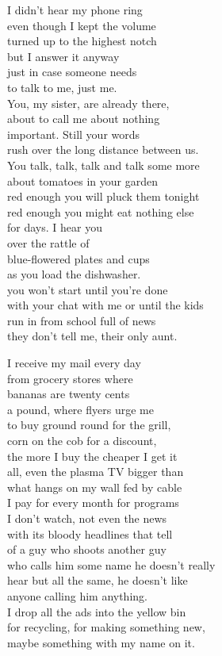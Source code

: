 \documentclass[twoside,10pt]{book}
\begin{document}
I didn't hear my phone ring\\
even though I kept the volume\\
turned up to the highest notch\\
but I answer it anyway\\
just in case someone needs\\
to talk to me, just me.\\
You, my sister, are already there,\\
about to call me about nothing\\
important. Still your words\\
rush over the long distance between us.\\
You talk, talk, talk and talk some more\\
about tomatoes in your garden\\
red enough you will pluck them tonight\\
red enough you might eat nothing else\\
for days. I hear you\\
over the rattle of\\
blue-flowered plates and cups\\
as you load the dishwasher.\\
you won't start until you're done\\
with your chat with me or until the kids\\
run in from school full of news\\
they don't tell me, their only aunt.

I receive my mail every day\\
from grocery stores where\\
bananas are twenty cents\\
a pound, where flyers urge me\\
to buy ground round for the grill,\\
corn on the cob for a discount,\\
the more I buy the cheaper I get it\\
all, even the plasma TV bigger than\\
what hangs on my wall fed by cable\\
I pay for every month for programs\\
I don't watch, not even the news\\
with its bloody headlines that tell\\
of a guy who shoots another guy\\
who calls him some name he doesn't really\\
hear but all the same, he doesn't like\\
anyone calling him anything.\\
I drop all the ads into the yellow bin\\
for recycling, for making something new,\\
maybe something with my name on it.
\end{document}
